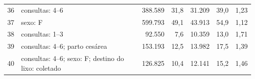 \begin{table}[H]
\begin{tabularx}{\textwidth}{@{}c Y r r r r r@{}}
36 & consultas: 4--6 & 388.589 & 31,8 & 31.209 & 39,0 & 1,23 \\
37 & sexo: F & 599.793 & 49,1 & 43.913 & 54,9 & 1,12 \\
38 & consultas: 1--3 & 92.550 & 7,6 & 10.359 & 13,0 & 1,71 \\
39 & consultas: 4--6; parto cesárea & 153.193 & 12,5 & 13.982 & 17,5 & 1,39 \\
40 & consultas: 4--6; sexo: F; destino do lixo: coletado & 126.825 & 10,4 & 12.141 & 15,2 & 1,46 \\
\bottomrule
\end{tabularx}
\end{table}








